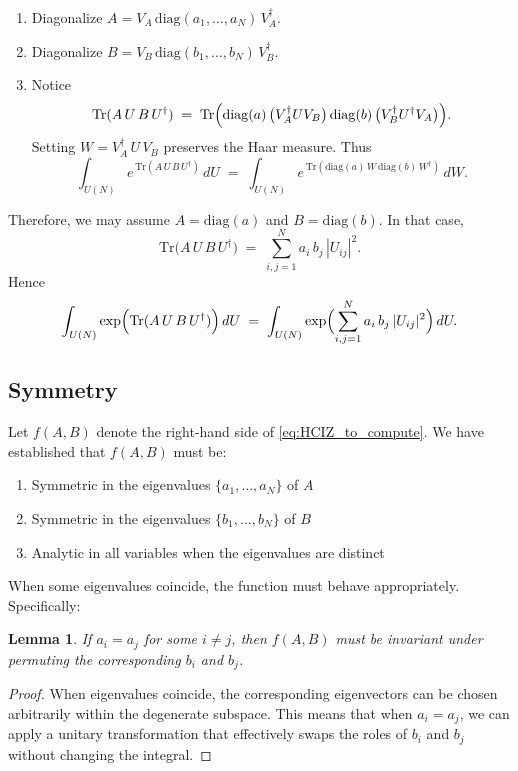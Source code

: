 \documentclass[letterpaper,11pt,oneside,reqno]{article}
\numberwithin{equation}{section}
\newtheorem{lemma}[proposition]{Lemma}
\theoremstyle{definition}
\begin{document}
\begin{enumerate}
   \item Diagonalize \(A = V_A\,\mathrm{diag}(a_1,\dots,a_N)\,V_A^\dagger\).
   \item Diagonalize \(B = V_B\,\mathrm{diag}(b_1,\dots,b_N)\,V_B^\dagger\).
   \item Notice
   \[
      \mathrm{Tr}(A\,U\,B\,U^\dagger)
      \;=\;
      \mathrm{Tr}\Bigl(\mathrm{diag}(a)\,\bigl(V_A^\dagger U V_B\bigr)\,\mathrm{diag}(b)\,\bigl(V_B^\dagger U^\dagger V_A\bigr)\Bigr).
   \]
   Setting \(W=V_A^\dagger\,U\,V_B\) preserves the Haar measure.  Thus
   \[
      \int_{U(N)} e^{\,\mathrm{Tr}(A\,U\,B\,U^\dagger)}\,dU
      \;=\;
      \int_{U(N)}
      e^{\,\mathrm{Tr}(\mathrm{diag}(a)\,W\,\mathrm{diag}(b)\,W^\dagger)}\,dW.
   \]
\end{enumerate}
Therefore, we may assume \(A=\mathrm{diag}(a)\) and \(B=\mathrm{diag}(b)\).  In that case,
\[
   \mathrm{Tr}\bigl(A\,U\,B\,U^\dagger\bigr)
   \;=\;
   \sum_{i,j=1}^N a_i\,b_j\,|U_{ij}|^2.
\]
Hence
\begin{equation}
	\label{eq:HCIZ_to_compute}
   \int_{U(N)}
   \exp\Bigl(\mathrm{Tr}(A\,U\,B\,U^\dagger)\Bigr)\,dU
   \;=\;
   \int_{U(N)}
   \exp\Bigl(\sum_{i,j=1}^N a_i\,b_j\,|U_{ij}|^2\Bigr)\,dU.
 \end{equation}

\subsection{Symmetry}

Let \(f(A,B)\) denote the
right-hand side of \eqref{eq:HCIZ_to_compute}.
We have established that $f(A,B)$ must be:
\begin{enumerate}
   \item Symmetric in the eigenvalues $\{a_1,\ldots,a_N\}$ of $A$
   \item Symmetric in the eigenvalues $\{b_1,\ldots,b_N\}$ of $B$
   \item Analytic in all variables when the eigenvalues are distinct
\end{enumerate}

When some eigenvalues coincide, the function must behave appropriately. Specifically:
\begin{lemma}
If $a_i = a_j$ for some $i \neq j$, then $f(A,B)$ must be invariant under permuting the corresponding $b_i$ and $b_j$.
\end{lemma}
\begin{proof}
When eigenvalues coincide, the corresponding eigenvectors can be chosen arbitrarily within the degenerate subspace. This means that when $a_i = a_j$, we can apply a unitary transformation that effectively swaps the roles of $b_i$ and $b_j$ without changing the integral.
\end{proof}
\end{document}
